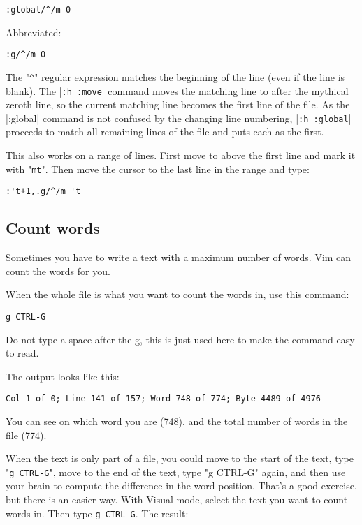 \begin{Verbatim}[samepage=true]
 :global/^/m 0
\end{Verbatim}

Abbreviated:

\begin{Verbatim}[samepage=true]
 :g/^/m 0
\end{Verbatim}

The "\verb!^!" regular expression matches the beginning of the line (even if the line is blank).
The |\verb!:h :move!| command moves the matching line to after the mythical zeroth line, so the current matching line becomes the first line of the file.
As the |:global| command is not confused by the changing line numbering, |\verb!:h :global!| proceeds to match all remaining lines of the file and puts each as the first.

This also works on a range of lines.
First move to above the first line and mark it with "\verb!mt!".
Then move the cursor to the last line in the range and type:

\begin{Verbatim}[samepage=true]
 :'t+1,.g/^/m 't
\end{Verbatim}
\subsection{Count words}
Sometimes you have to write a text with a maximum number of words.
Vim can count the words for you.

When the whole file is what you want to count the words in, use this command:

\begin{Verbatim}[samepage=true]
 g CTRL-G
\end{Verbatim}

Do not type a space after the g, this is just used here to make the command easy to read.

The output looks like this:

\begin{Verbatim}[samepage=true]
    Col 1 of 0; Line 141 of 157; Word 748 of 774; Byte 4489 of 4976 
\end{Verbatim}

You can see on which word you are (748), and the total number of words in the file (774).

When the text is only part of a file, you could move to the start of the text, type "\verb!g CTRL-G!", move to the end of the text, type "g CTRL-G" again, and then use your brain to compute the difference in the word position.
That's a good exercise, but there is an easier way.
With Visual mode, select the text you want to count words in.
Then type \verb!g CTRL-G!.
The result:

